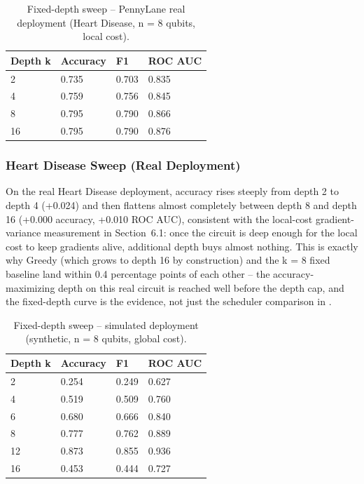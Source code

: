 \begin{table}[htbp]
\centering
\caption{Fixed-depth sweep -- PennyLane real deployment (Heart Disease, n = 8 qubits, local cost).}
\label{tab:sweep_heart}
\begin{tabular}{|p{2.4cm}|p{2.3cm}|p{2cm}|p{2.4cm}|}
\hline
\textbf{Depth k} & \textbf{Accuracy} & \textbf{F1} & \textbf{ROC AUC} \\
\hline
2 & 0.735 & 0.703 & 0.835 \\
4 & 0.759 & 0.756 & 0.845 \\
8 & 0.795 & 0.790 & 0.866 \\
16 & 0.795 & 0.790 & 0.876 \\
\hline
\end{tabular}
\end{table}

\subsubsection{Heart Disease Sweep (Real Deployment)}
On the real Heart Disease deployment, accuracy rises steeply from depth 2 to depth 4 (+0.024) and then flattens almost completely between depth 8 and depth 16 (+0.000 accuracy, +0.010 ROC AUC), consistent with the local-cost gradient-variance measurement in Section~6.1: once the circuit is deep enough for the local cost to keep gradients alive, additional depth buys almost nothing. This is exactly why Greedy (which grows to depth 16 by construction) and the k = 8 fixed baseline land within 0.4 percentage points of each other -- the accuracy-maximizing depth on this real circuit is reached well before the depth cap, and the fixed-depth curve is the evidence, not just the scheduler comparison in .

\begin{table}[htbp]
\centering
\caption{Fixed-depth sweep -- simulated deployment (synthetic, n = 8 qubits, global cost).}
\label{tab:sweep_sim8g}
\begin{tabular}{|p{2.4cm}|p{2.3cm}|p{2cm}|p{2.4cm}|}
\hline
\textbf{Depth k} & \textbf{Accuracy} & \textbf{F1} & \textbf{ROC AUC} \\
\hline
2 & 0.254 & 0.249 & 0.627 \\
4 & 0.519 & 0.509 & 0.760 \\
6 & 0.680 & 0.666 & 0.840 \\
8 & 0.777 & 0.762 & 0.889 \\
12 & 0.873 & 0.855 & 0.936 \\
16 & 0.453 & 0.444 & 0.727 \\
\hline
\end{tabular}
\end{table}

